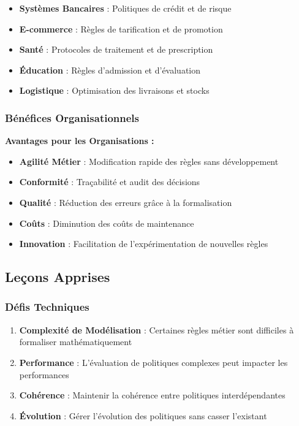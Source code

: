 \documentclass[12pt,a4paper]{article}
\begin{document}
    \begin{itemize}
        \item \textbf{Systèmes Bancaires} : Politiques de crédit et de risque
        \item \textbf{E-commerce} : Règles de tarification et de promotion
        \item \textbf{Santé} : Protocoles de traitement et de prescription
        \item \textbf{Éducation} : Règles d'admission et d'évaluation
        \item \textbf{Logistique} : Optimisation des livraisons et stocks
    \end{itemize}

    \subsubsection{Bénéfices Organisationnels}

    \begin{policybox}
        \textbf{Avantages pour les Organisations :}

        \begin{itemize}
            \item \textbf{Agilité Métier} : Modification rapide des règles sans développement
            \item \textbf{Conformité} : Traçabilité et audit des décisions
            \item \textbf{Qualité} : Réduction des erreurs grâce à la formalisation
            \item \textbf{Coûts} : Diminution des coûts de maintenance
            \item \textbf{Innovation} : Facilitation de l'expérimentation de nouvelles règles
        \end{itemize}
    \end{policybox}

    \subsection{Leçons Apprises}

    \subsubsection{Défis Techniques}

    \begin{enumerate}
        \item \textbf{Complexité de Modélisation} : Certaines règles métier sont difficiles à formaliser mathématiquement
        \item \textbf{Performance} : L'évaluation de politiques complexes peut impacter les performances
        \item \textbf{Cohérence} : Maintenir la cohérence entre politiques interdépendantes
        \item \textbf{Évolution} : Gérer l'évolution des politiques sans casser l'existant
    \end{enumerate}
\end{document}
